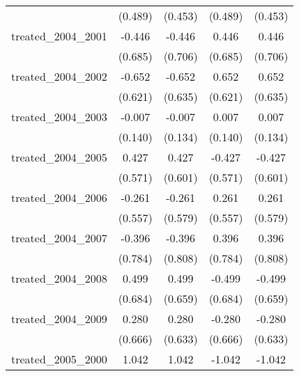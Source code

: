 {\begin{tabular}{l*{4}{c}}
            &     (0.489)         &     (0.453)         &     (0.489)         &     (0.453)         \\
[1em]
treated\_2004\_2001&      -0.446         &      -0.446         &       0.446         &       0.446         \\
            &     (0.685)         &     (0.706)         &     (0.685)         &     (0.706)         \\
[1em]
treated\_2004\_2002&      -0.652         &      -0.652         &       0.652         &       0.652         \\
            &     (0.621)         &     (0.635)         &     (0.621)         &     (0.635)         \\
[1em]
treated\_2004\_2003&      -0.007         &      -0.007         &       0.007         &       0.007         \\
            &     (0.140)         &     (0.134)         &     (0.140)         &     (0.134)         \\
[1em]
treated\_2004\_2005&       0.427         &       0.427         &      -0.427         &      -0.427         \\
            &     (0.571)         &     (0.601)         &     (0.571)         &     (0.601)         \\
[1em]
treated\_2004\_2006&      -0.261         &      -0.261         &       0.261         &       0.261         \\
            &     (0.557)         &     (0.579)         &     (0.557)         &     (0.579)         \\
[1em]
treated\_2004\_2007&      -0.396         &      -0.396         &       0.396         &       0.396         \\
            &     (0.784)         &     (0.808)         &     (0.784)         &     (0.808)         \\
[1em]
treated\_2004\_2008&       0.499         &       0.499         &      -0.499         &      -0.499         \\
            &     (0.684)         &     (0.659)         &     (0.684)         &     (0.659)         \\
[1em]
treated\_2004\_2009&       0.280         &       0.280         &      -0.280         &      -0.280         \\
            &     (0.666)         &     (0.633)         &     (0.666)         &     (0.633)         \\
[1em]
treated\_2005\_2000&       1.042         &       1.042         &      -1.042         &      -1.042         \\

\end{tabular}}
